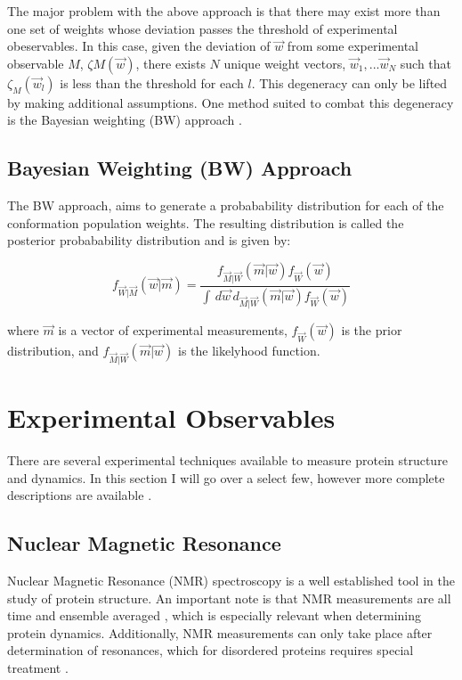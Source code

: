 \documentclass{article}
\begin{document}
The major problem with the above approach is that there may exist more than one set of weights whose deviation passes the threshold of experimental obeservables.
In this case, given the deviation of $\vec w$ from some experimental observable $M$,  $\zeta{M}(\vec w)$, there exists $N$ unique weight vectors, 
$\vec w_1,...\vec w_N$ such that $\zeta_{M}(\vec w_l)$ is less than the threshold for each $l$. 
This degeneracy can only be lifted by making additional assumptions. 
One method suited to combat this degeneracy is the Bayesian weighting (BW) approach \cite{fisherModelingIntrinsicallyDisordered2010}.

\subsection{Bayesian Weighting (BW) Approach}

The BW approach, \cite{fisherModelingIntrinsicallyDisordered2010} aims to generate a probabability distribution for each of the conformation population weights.
The resulting distribution is called the posterior probabability distribution and is given by:


\begin{equation}
    f_{\vec W | \vec M} \left ( \vec w | \vec m \right ) = \frac{f_{\vec M | \vec W} \left ( \vec m | \vec w \right ) f_{\vec W} \left( \vec w \right ) }{\int \, d\vec w \, d_{\vec M| \vec W} \left (\vec m| \vec w \right) f_{\vec W} \left (\vec w \right) }
\end{equation}

where $\vec m$ is a vector of experimental measurements, $f_{\vec W} (\vec w)$ is the prior distribution, and $f_{\vec M | \vec W} \left ( \vec m | \vec w \right )$ is the likelyhood function.
\section{Experimental Observables}
There are several experimental techniques available to measure protein structure and dynamics. In this section I will go over a select few, however more complete descriptions are available \cite{thomasenConformationalEnsemblesIntrinsically2022}.

\subsection{Nuclear Magnetic Resonance}
Nuclear Magnetic Resonance (NMR) spectroscopy is a well established tool in the study of protein structure.
An important note is that NMR measurements are all time and ensemble averaged \cite{marionIntroductionBiologicalNMR2013}, which is especially relevant when determining protein dynamics. Additionally, NMR measurements can only take place after determination of resonances, which for disordered proteins requires special treatment \cite{marionIntroductionBiologicalNMR2013}.
\end{document}
